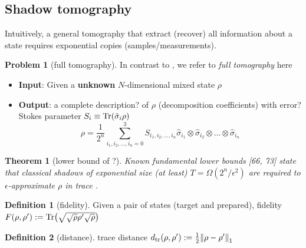 \documentclass[
10pt,
aps,
pra,
linenumbers,
floatfix,
]{revtex4-2}
\theoremstyle{plain}
\newtheorem{theorem}{Theorem}
\theoremstyle{definition}
\newtheorem{definition}{Definition}
\newtheorem{problem}{Problem}
\newcommand{\dm}{\rho}
\begin{document}
\subsection{Shadow tomography}
Intuitively, a general tomography \cite{altepeterPhotonicStateTomography2005} that extract (recover) all information about a state requires exponential copies (samples/measurements).
\begin{problem}[full tomography]\label{prm:full_tomography}
	In contrast to , we refer to \emph{full tomography} here
	\begin{itemize}
		\item \textbf{Input}: Given a \textbf{unknown} $N$-dimensional mixed state $\dm$
		\item \textbf{Output}: a complete description? of $\dm$ (decomposition coefficients) with error?
		Stokes parameter $S_i\equiv \Tr(\hat{\sigma}_i \dm)$
		\begin{equation}
			\dm = \frac{1}{2^n} \sum_{i_1,i_2,\dots,i_n=0}^3
			S_{i_1,i_2,\dots,i_n} 
			\hat{\sigma}_{i_1} \otimes \hat{\sigma}_{i_2} \otimes \dots \otimes \hat{\sigma}_{i_n} 
		\end{equation}
	\end{itemize}
\end{problem}
\begin{theorem}[lower bound of ?\cite{haahSampleoptimalTomographyQuantum2017}]
	Known fundamental lower bounds [66, 73] state that classical shadows of exponential size (at least) $T = \Omega( 2^n / \epsilon^2)$ are required to $\epsilon$-approximate $\dm$ in trace .
\end{theorem}
\begin{definition}[fidelity]\label{def:fidelity}
	Given a pair of states (target and prepared), 
	fidelity $F(\rho,\rho') : = \Tr(\sqrt{\sqrt{\rho}\rho'\sqrt{\rho}})$
\end{definition}
\begin{definition}[distance]\label{def:distance}
	trace distance $d_{\tr}(\rho,\rho') : = \frac{1}{2} \norm{\rho-\rho'}_1$
\end{definition}
\end{document}
